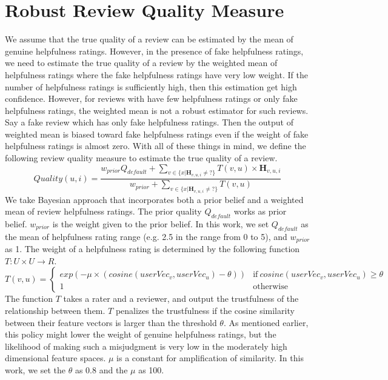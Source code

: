 \documentclass[master,english,final]{kaist-ucs}
\begin{document}
\section{Robust Review Quality Measure}
We assume that the true quality of a review can be estimated by the mean of genuine helpfulness ratings.
However, in the presence of fake helpfulness ratings, we need to estimate the true quality of a review by the weighted mean of helpfulness ratings where the fake helpfulness ratings have very low weight.
If the number of helpfulness ratings is sufficiently high, then this estimation get high confidence.
However, for reviews with have few helpfulness ratings or only fake helpfulness ratings, the weighted mean is not a robust estimator for such reviews.
Say a fake review which has only fake helpfulness ratings.
Then the output of weighted mean is biased toward fake helpfulness ratings even if the weight of fake helpfulness ratings is almost zero.
With all of these things in mind, we define the following review quality measure to estimate the true quality of a review.
\begin{equation}
Quality(u,i) = \frac{ w_{prior} Q_{default} + \sum_{v \in \{x|\bm{H}_{v,u,i} \neq ?\}} T(v,u) \times \bm{H}_{v,u,i} } {w_{prior}  + \sum_{v \in \{x|\bm{H}_{v,u,i} \neq ?\}} T(v,u) }
\end{equation}
We take Bayesian approach that incorporates both a prior belief and a weighted mean of review helpfulness ratings.
The prior quality $Q_{default}$ works as prior belief.
$w_{prior}$ is the weight given to the prior belief.
In this work, we set $Q_{default}$ as the mean of helpfulness rating range (e.g. 2.5 in the range from 0 to 5), and $w_{prior}$ as 1.
The weight of a helpfulness rating is determined by the following function $T: U \times U \rightarrow R$.
\begin{equation}
T(v,u)=
\begin{cases}
  exp(-\mu \times(cosine(userVec_v,userVec_u)-\theta)) & \text{if}\ cosine(userVec_v,userVec_u) \geq \theta \\
  1 & \text{otherwise}
\end{cases}
\end{equation}
The function $T$ takes a rater and a reviewer, and output the trustfulness of the relationship between them.
$T$ penalizes the trustfulness if the cosine similarity between their feature vectors is larger than the threshold $\theta$.
As mentioned earlier, this policy might lower the weight of genuine helpfulness ratings, but the likelihood of making such a misjudgment is very low in the moderately high dimensional feature spaces.
$\mu$ is a constant for amplification of similarity.
In this work, we set the $\theta$ as 0.8 and the $\mu$ as 100.
\end{document}
